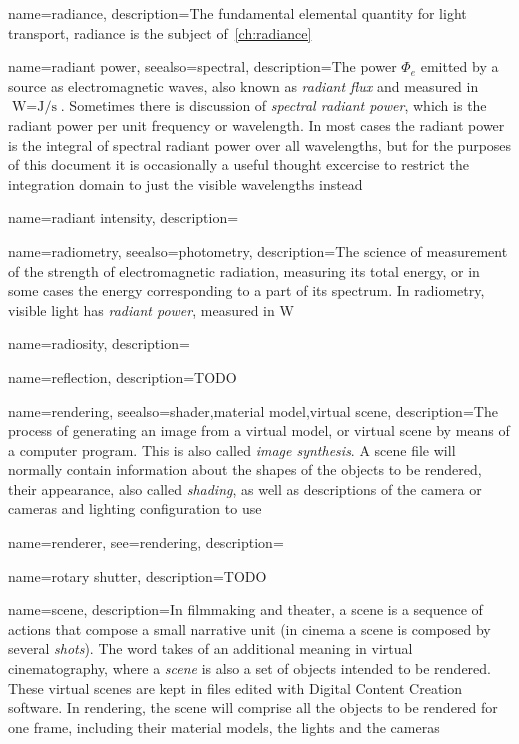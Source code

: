 {
	name=radiance,
	description={The fundamental elemental quantity for light transport, radiance
		is the subject of~\cref{ch:radiance}}
}

{
	name={radiant power},
	seealso={spectral},
	description={The power $\Phi_e$ emitted by a source as electromagnetic waves,
		also known as \textsl{radiant flux} and measured in 
		$\unit{\watt} = \unit{\joule\per\second}$. 
		Sometimes there is discussion of \textsl{spectral radiant power},
		which is the radiant power per unit frequency or wavelength.
		In most cases the radiant power is the integral of spectral radiant power
		over all wavelengths, but for the purposes of this document it is occasionally 
		a useful thought excercise to restrict the integration domain to just the
		visible wavelengths instead}
}

{
	name={radiant intensity},
	description=\nopostdesc
}

{
	name={radiometry},
	seealso={photometry},
	description={The science of measurement of the strength of electromagnetic radiation,
		measuring its total energy, or in some cases the energy corresponding to a part of
		its spectrum. In radiometry, visible light has \textsl{radiant power},
		measured in \unit{\watt}}
}

{
	name={radiosity},
	description=\nopostdesc
}

{
	name={reflection},
	description={TODO}
}

{
	name={rendering},
	seealso={shader,material model,virtual scene},
	description={The process of generating an image from a virtual model, or virtual scene by 
		means of a computer program. This is also called \textsl{image synthesis}. A scene file
		will normally contain information about the shapes of the objects to be rendered, their
		appearance, also called \textsl{shading}, as well as descriptions of the camera or cameras and lighting configuration
		to use}
}

{
	name={renderer},
	see={rendering},
	description=\nopostdesc
}

{
	name={rotary shutter},
	description={TODO}
}

{
    name={scene},
	description={In filmmaking and theater, a scene is a sequence of actions that compose
		a small narrative unit (in cinema a scene is composed by several 
		\textsl{shots}). 
		The word takes of an additional meaning in virtual cinematography, 
		where a \textsl{scene} is also a set of objects intended to be rendered.
		These virtual scenes are kept in files edited with 
		Digital Content Creation software.
		In rendering, the scene will comprise all the objects to be rendered for one frame,
		including their material models, the lights and the cameras}
}

